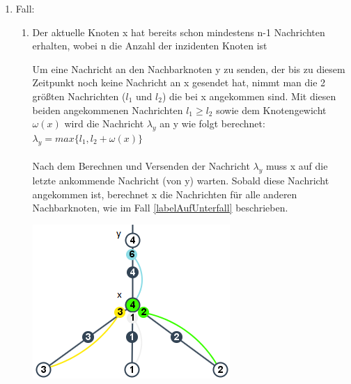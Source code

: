 \begin{enumerate}
			
	\item Fall: \label{paperAlgoFall1}
	
		\begin{enumerate}
			
			\item Der aktuelle Knoten x hat bereits schon mindestens n-1 Nachrichten erhalten, wobei n die Anzahl der inzidenten Knoten ist
			\\
			
				\begin{minipage}{0.50\textwidth} 
					
					Um eine Nachricht an den Nachbarknoten y zu senden, der bis zu diesem Zeitpunkt noch keine Nachricht an x gesendet hat, nimmt man die 2 größten Nachrichten ($l_{1}$ und $l_{2}$) die bei x angekommen sind. Mit diesen beiden angekommenen Nachrichten $l_{1} \ge l_{2}$ sowie dem Knotengewicht $\omega(x)$ wird die Nachricht $\lambda_{y}$ an y wie folgt berechnet:\\
					$\lambda_{y} = max\{l_{1},  l_{2} + \omega(x)\}$
					\\
					\\	
					Nach dem Berechnen und Versenden der Nachricht $\lambda_{y}$ muss x auf die letzte ankommende Nachricht (von y) warten. Sobald diese Nachricht angekommen ist, berechnet x die Nachrichten für alle anderen Nachbarknoten, wie im Fall \ref{labelAufUnterfall} beschrieben. 
				\end{minipage}
				\hfill
				\begin{minipage}{0.35\textwidth}
					
					\includegraphics[width=\textwidth]{bilder/abb_paper_n-1knoten.png}
				\end{minipage}
				

\end{enumerate}
\end{enumerate}
